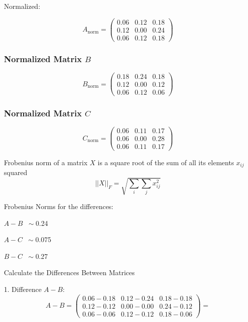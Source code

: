 Normalized:

\[
A_{\text{norm}} = \begin{pmatrix}
0.06 & 0.12 & 0.18 \\
0.12 & 0.00 & 0.24 \\
0.06 & 0.12 & 0.18
\end{pmatrix}
\]

\subsubsection*{Normalized Matrix \( B \)}

\[
B_{\text{norm}} = \begin{pmatrix}
0.18 & 0.24 & 0.18 \\
0.12 & 0.00 & 0.12 \\
0.06 & 0.12 & 0.06
\end{pmatrix}
\]

\subsubsection*{Normalized Matrix \( C \)}

\[
C_{\text{norm}} = \begin{pmatrix}
0.06 & 0.11 & 0.17 \\
0.06 & 0.00 & 0.28 \\
0.06 & 0.11 & 0.17
\end{pmatrix}
\]

Frobenius norm of a matrix $X$ is a square root of the sum of all its elements $x_{ij}$ squared
\begin{equation}
    ||X||_F = \sqrt{\sum \limits_i \sum \limits_j x_{ij}^2}
\end{equation}


Frobenius Norms for the differences:

$A-B$ 	$~\sim$0.24

$A-C$	$~\sim$0.075

$B-C$ 	$~\sim$0.27

Calculate the Differences Between Matrices


1. Difference \( A - B \):
\begin{equation} \nonumber
A - B = \begin{pmatrix}
0.06 - 0.18 & 0.12 - 0.24 & 0.18 - 0.18 \\
0.12 - 0.12 & 0.00 - 0.00 & 0.24 - 0.12 \\
0.06 - 0.06 & 0.12 - 0.12 & 0.18 - 0.06
\end{pmatrix} = 
\end{equation}

